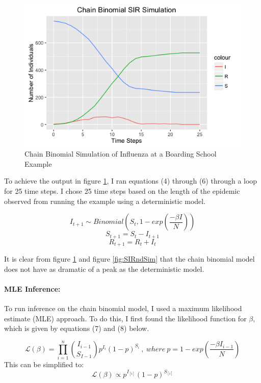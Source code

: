 \documentclass{article}
\begin{document}
\begin{figure}[htbp]
\includegraphics[scale=.5, center]{ChainBinomSim.png}
\caption{Chain Binomial Simulation of Influenza at a Boarding School Example}
\label{fig:ChainBinomSim}
\end{figure}

To achieve the output in figure \ref{fig:ChainBinomSim}, I ran equations (4) through (6) through a loop for 25 time steps. I chose 25 time steps based on the length of the epidemic observed from running the example using a deterministic model. 

\begin{equation} 
I_{t+1} \sim Binomial(S_{t}, 1-exp(\frac{-\beta I}{N})) 
\end{equation}
\begin{equation} 
S_{t+1} = S_{t} - I_{t+1} 
\end{equation}
\begin{equation}
R_{t+1} = R_{t} + I_{t}
\end{equation}

It is clear from figure \ref{fig:ChainBinomSim} and figure \ref{fig:SIRndSim} that the chain binomial model does not have as dramatic of a peak as the deterministic model. 

\paragraph{MLE Inference:}
To run inference on the chain binomial model, I used a maximum likelihood estimate (MLE) approach. To do this, I first found the likelihood function for $\beta$, which is given by equations (7) and (8) below. 


\begin{equation}
\mathcal{L}(\beta) =  \prod_{i=1}^n {I_{i-1}\choose S_{I-1}} p^{I_{i}}(1-p)^{S_{i}}
~, ~where ~ p = 1-exp(\frac{-\beta I_{i-1}}{N})
\end{equation}
This can be simplified to:
\begin{equation}
\mathcal{L}(\beta) \propto p^{I_{[i]}}(1-p)^{S_{[i]}}
\end{equation}
\end{document}
